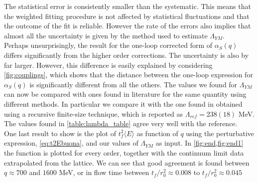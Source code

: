 The statistical error is consistently smaller than the systematic. This means that the weighted fitting procedure is not affected by statistical fluctuations and that the outcome of the fit is reliable. However the rate of the errors also implies that almost all the uncertainty is given by the method used to estimate $\Lambda_{YM}$. \\
Perhaps unsurprisingly, the result for the one-loop corrected form of $\alpha_S(q)$ differs significantly from the higher order corrections. The uncertainty is also by far larger. However, this difference is easily explained by considering \cref{fig:couplings}, which shows that the distance between the one-loop expression for $\alpha_S(q)$ is significantly different from all the others. 
The values we found for $\Lambda_{YM}$ can now be compared with ones found in literature for the same quantity using different methods. In particular we compare it with the one found in \cite{capitani_non-perturbative_1999} obtained using a recursive finite-size technique, which is reported as $\Lambda_{ref} = 238(18)$ MeV. The values found in \cref{table:lambda_table} agree very well with the reference.\\ 
One last result to show is the plot of $t_f^2\langle E\rangle$ as function of $q$ using the perturbative expression, \cref{eq:t2Ebuona}, and our values of $\Lambda_{YM}$ as input. In \cref{fig:end,fig:end1} the function is plotted for every order, together with the continuum limit data extrapolated from the lattice. We can see that good agreement is found between $q \approx 700$ and $1600$ MeV, or in flow time between $t_f/r_0^2 \approx 0.008$ to $t_f/r_0^2 \approx 0.045$

